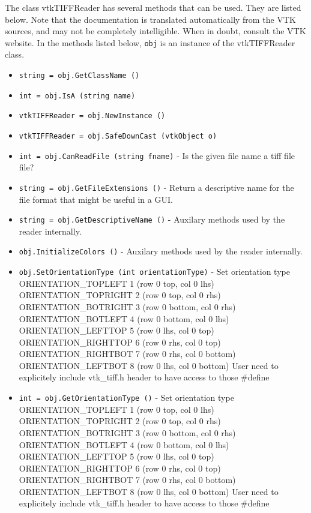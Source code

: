 The class vtkTIFFReader has several methods that can be used.
  They are listed below.
Note that the documentation is translated automatically from the VTK sources,
and may not be completely intelligible.  When in doubt, consult the VTK website.
In the methods listed below, \verb|obj| is an instance of the vtkTIFFReader class.
\begin{itemize}
\item  \verb|string = obj.GetClassName ()|

\item  \verb|int = obj.IsA (string name)|

\item  \verb|vtkTIFFReader = obj.NewInstance ()|

\item  \verb|vtkTIFFReader = obj.SafeDownCast (vtkObject o)|

\item  \verb|int = obj.CanReadFile (string fname)| -  Is the given file name a tiff file file?

\item  \verb|string = obj.GetFileExtensions ()| -  Return a descriptive name for the file format that might be useful
 in a GUI.

\item  \verb|string = obj.GetDescriptiveName ()| -  Auxilary methods used by the reader internally.

\item  \verb|obj.InitializeColors ()| -  Auxilary methods used by the reader internally.

\item  \verb|obj.SetOrientationType (int orientationType)| -  Set orientation type 
 ORIENTATION\_TOPLEFT         1       (row 0 top, col 0 lhs)
 ORIENTATION\_TOPRIGHT        2       (row 0 top, col 0 rhs)
 ORIENTATION\_BOTRIGHT        3       (row 0 bottom, col 0 rhs)
 ORIENTATION\_BOTLEFT         4       (row 0 bottom, col 0 lhs)
 ORIENTATION\_LEFTTOP         5       (row 0 lhs, col 0 top)
 ORIENTATION\_RIGHTTOP        6       (row 0 rhs, col 0 top)
 ORIENTATION\_RIGHTBOT        7       (row 0 rhs, col 0 bottom)
 ORIENTATION\_LEFTBOT         8       (row 0 lhs, col 0 bottom)
 User need to explicitely include vtk\_tiff.h header to have access to those \#define

\item  \verb|int = obj.GetOrientationType ()| -  Set orientation type 
 ORIENTATION\_TOPLEFT         1       (row 0 top, col 0 lhs)
 ORIENTATION\_TOPRIGHT        2       (row 0 top, col 0 rhs)
 ORIENTATION\_BOTRIGHT        3       (row 0 bottom, col 0 rhs)
 ORIENTATION\_BOTLEFT         4       (row 0 bottom, col 0 lhs)
 ORIENTATION\_LEFTTOP         5       (row 0 lhs, col 0 top)
 ORIENTATION\_RIGHTTOP        6       (row 0 rhs, col 0 top)
 ORIENTATION\_RIGHTBOT        7       (row 0 rhs, col 0 bottom)
 ORIENTATION\_LEFTBOT         8       (row 0 lhs, col 0 bottom)
 User need to explicitely include vtk\_tiff.h header to have access to those \#define


\end{itemize}
